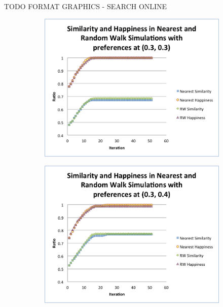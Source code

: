 \documentclass[11pt,twoside]{amsart}
\theoremstyle{theorem}
\theoremstyle{definition}
\theoremstyle{remark}
\begin{document}
TODO FORMAT GRAPHICS - SEARCH ONLINE
    \begin{figure}
        \begin{subfigure}[b]{0.3\textwidth}
            \includegraphics[scale=0.35]{3_3.png}
        \end{subfigure}

        \begin{subfigure}[b]{0.3\textwidth}
            \includegraphics[scale=0.35]{3_4.png}
        \end{subfigure}
    \end{figure}
\end{document}

